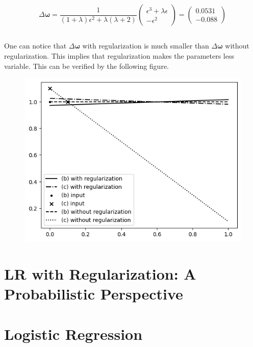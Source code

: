 \documentclass[12pt]{article}
\begin{document}
\begin{equation}
    \Delta \boldsymbol{\omega} = \frac{1}{(1+\lambda)\epsilon^2 + \lambda(\lambda + 2)} \begin{pmatrix}
        \epsilon^3 + \lambda\epsilon \\ -\epsilon^2
    \end{pmatrix} = \begin{pmatrix}
        0.0531 \\ -0.088
    \end{pmatrix}
\end{equation}

\subsection{}
One can notice that $\Delta \boldsymbol{\omega}$ with regularization is much smaller than $\Delta \boldsymbol{\omega}$ without regularization. This implies that regularization makes the parameters less variable. This can be verified by the following figure.

\begin{figure}[!h]
    \centering
    \includegraphics[scale = 0.5]{./figures/output.png}
\end{figure}

\section{LR with Regularization: A Probabilistic Perspective}



\section{Logistic Regression}
\end{document}
